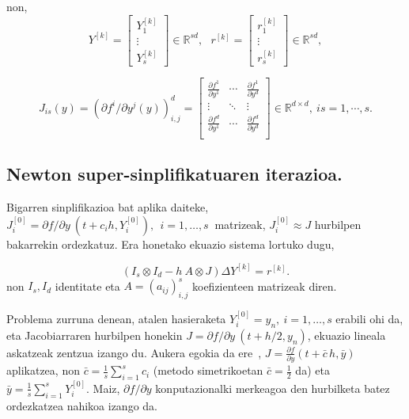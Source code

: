 non,
\begin{equation*}
\label{eq:806}
Y^{[k]}=\begin{bmatrix}
Y_1^{[k]} \\
\vdots \\
Y_s^{[k]}
\end{bmatrix} \in \mathbb{R}^{sd}, \ \ \
r^{[k]}=\begin{bmatrix}
r_1^{[k]} \\
\vdots \\
r_s^{[k]}
\end{bmatrix} \in \mathbb{R}^{sd},
\end{equation*}

\begin{equation*}
\label{eq:807}
J_{is}(y)=\left(\partial f^i/\partial y^j (y)\right)_{i,j}^d=
\begin{bmatrix}
    \frac{\partial f^1}{\partial y^1} & \cdots & \frac{\partial f^1}{\partial y^d}\\    
    \vdots & \ddots & \vdots \\    
    \frac{\partial f^d}{\partial y^1} & \cdots & \frac{\partial f^d}{\partial y^d}\\    
\end{bmatrix} \in \mathbb{R}^{d \times d},\ is=1,\cdots,s.
\end{equation*}

\subsection*{Newton super-sinplifikatuaren iterazioa.}

Bigarren sinplifikazioa bat aplika daiteke, $J_i^{[0]}=\partial f / \partial y \ (t+c_ih, Y_i^{[0]}), \ \  i=1,\dots,s \ $ matrizeak,  $J_i^{[0]} \approx J$ hurbilpen bakarrekin ordezkatuz. Era honetako ekuazio sistema lortuko dugu,   

\begin{equation}
\label{eq:808}
(I_s \otimes I_d - h \ A \otimes J) \Delta Y^{[k]} = r^{[k]}.
\end{equation}
non $I_s,I_d$ identitate eta $A=(a_{ij})_{i,j}^s$ koefizienteen matrizeak diren.

Problema zurruna denean, atalen hasieraketa $Y_i^{[0]}=y_n, \ i=1,\dots,s$  erabili ohi da, eta Jacobiarraren hurbilpen honekin $J=\partial f / \partial y \ (t+h/2, y_n)$, ekuazio lineala askatzeak zentzua izango du.  Aukera egokia da ere~\cite{Xie2009},  $J=  \frac{\partial f}{\partial y}(t+\bar c \, h,\bar y)$ aplikatzea, non $\bar c = \frac{1}{s} \sum_{i=1}^{s}c_i$ (metodo simetrikoetan $\bar c = \frac12$ da)  eta  $\bar y =  \frac{1}{s} \sum_{i=1}^{s}Y_i^{[0]}$. Maiz, $\partial f/\partial y$  konputazionalki merkeagoa den hurbilketa batez ordezkatzea nahikoa izango da. 

